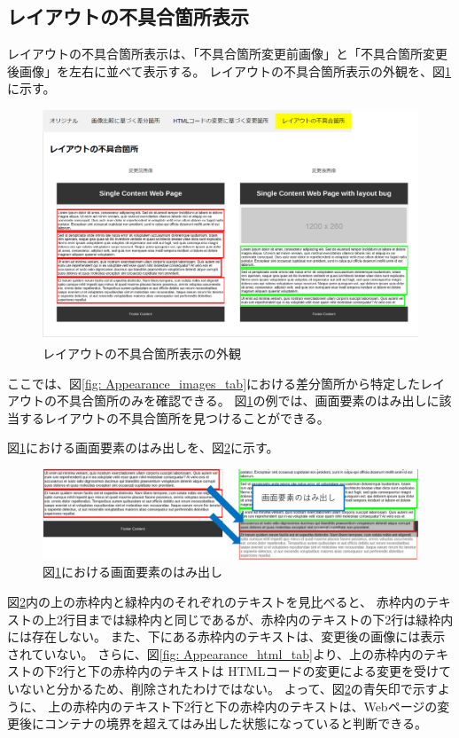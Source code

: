 \subsection{レイアウトの不具合箇所表示}\label{subsec:subeffect_tab}
レイアウトの不具合箇所表示は、「不具合箇所変更前画像」と「不具合箇所変更後画像」を左右に並べて表示する。
レイアウトの不具合箇所表示の外観を、図\ref{fig: Appearance_subEffect_tab}に示す。
\begin{figure}[tp]
    \begin{center}
        \includegraphics[width=1.0\columnwidth]{image/new_effect.png}
        \caption{レイアウトの不具合箇所表示の外観}
        \label{fig: Appearance_subEffect_tab}
    \end{center}
\end{figure}
ここでは、図\ref{fig: Appearance_images_tab}における差分箇所から特定したレイアウトの不具合箇所のみを確認できる。
図\ref{fig: Appearance_subEffect_tab}の例では、画面要素のはみ出しに該当するレイアウトの不具合箇所を見つけることができる。
\par
図\ref{fig: Appearance_subEffect_tab}における画面要素のはみ出しを、図\ref{fig: out_of_element}に示す。
\begin{figure}[tp]
    \begin{center}
        \includegraphics[width=1.0\columnwidth]{image/3_hamidasi_3.png}
        \caption{図\ref{fig: Appearance_subEffect_tab}における画面要素のはみ出し}
        \label{fig: out_of_element}
    \end{center}
\end{figure}
図\ref{fig: out_of_element}内の上の赤枠内と緑枠内のそれぞれのテキストを見比べると、
赤枠内のテキストの上2行目までは緑枠内と同じであるが、赤枠内のテキストの下2行は緑枠内には存在しない。
また、下にある赤枠内のテキストは、変更後の画像には表示されていない。
さらに、図\ref{fig: Appearance_html_tab}より、上の赤枠内のテキストの下2行と下の赤枠内のテキストは
HTMLコードの変更による変更を受けていないと分かるため、削除されたわけではない。
よって、図\ref{fig: out_of_element}の青矢印で示すように、
上の赤枠内のテキスト下2行と下の赤枠内のテキストは、Webページの変更後にコンテナの境界を超えてはみ出した状態になっていると判断できる。
